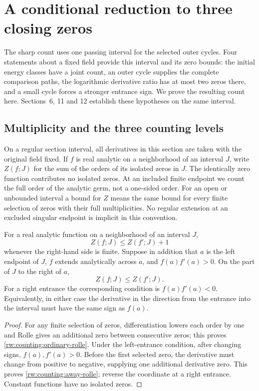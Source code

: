 \section{A conditional reduction to three closing zeros}
\label{rw:counting}

The sharp count uses one passing interval for the selected outer
cycles.  Four statements about a fixed field provide this interval
and its zero bounds: the initial energy classes have a joint count,
an outer cycle supplies the complete comparison paths, the logarithmic
derivative ratio has at most two zeros there, and a small cycle forces
a stronger entrance sign.  We prove the resulting count here.
Sections~6, 11 and 12 establish these hypotheses on the same interval.

\subsection{Multiplicity and the three counting levels}

On a regular section interval, all derivatives in this section are taken
with the original field fixed.  If $f$ is real analytic on a neighborhood
of an interval $J$, write $Z(f;J)$ for the sum of the orders of its isolated
zeros in $J$.  The identically zero function contributes no isolated zeros.  At an
included finite endpoint we count the full order of the analytic germ,
not a one-sided order.  For an open or unbounded interval a bound for $Z$
means the same bound for every finite selection of zeros with their full
multiplicities.  No regular extension at an excluded singular endpoint is
implicit in this convention.

\begin{lemma}
\label{rw:counting:rolle}
For a real analytic function on a neighborhood of an interval $J$,
\begin{equation}\label{rw:counting:ordinary-rolle}
 Z(f;J)\le Z(f';J)+1
\end{equation}
whenever the right-hand side is finite.  Suppose in addition that $a$ is
the left endpoint of $J$, $f$ extends analytically across $a$, and
$f(a)f'(a)>0$.  On the part of $J$ to the right of $a$,
\begin{equation}\label{rw:counting:away-rolle}
 Z(f;J)\le Z(f';J).
\end{equation}
For a right entrance the corresponding condition is $f(a)f'(a)<0$.
Equivalently, in either case the derivative in the direction from the
entrance into the interval must have the same sign as $f(a)$.
\end{lemma}
\begin{proof}
For any finite selection of zeros, differentiation lowers each order
by one and Rolle gives an additional zero between consecutive zeros;
this proves \eqref{rw:counting:ordinary-rolle}. Under the left-entrance
condition, after changing signs, \(f(a),f'(a)>0\). Before the first
selected zero, the derivative must change from positive to negative,
supplying one additional derivative zero. This proves
\eqref{rw:counting:away-rolle}; reverse the coordinate at a right
entrance. Constant functions have no isolated zeros.
\end{proof}

